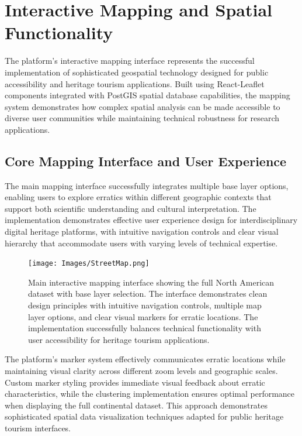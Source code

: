 \section{Interactive Mapping and Spatial Functionality}
\label{sec:interactive_mapping_results}

The platform's interactive mapping interface represents the successful implementation of sophisticated geospatial technology designed for public accessibility and heritage tourism applications. Built using React-Leaflet components integrated with PostGIS spatial database capabilities, the mapping system demonstrates how complex spatial analysis can be made accessible to diverse user communities while maintaining technical robustness for research applications.

\subsection{Core Mapping Interface and User Experience}
\label{subsec:core_mapping_interface}

The main mapping interface successfully integrates multiple base layer options, enabling users to explore erratics within different geographic contexts that support both scientific understanding and cultural interpretation. The implementation demonstrates effective user experience design for interdisciplinary digital heritage platforms, with intuitive navigation controls and clear visual hierarchy that accommodate users with varying levels of technical expertise.

\begin{figure}[htbp]
    \centering
    \texttt{[image: Images/StreetMap.png]}
    \caption{Main interactive mapping interface showing the full North American dataset with base layer selection. The interface demonstrates clean design principles with intuitive navigation controls, multiple map layer options, and clear visual markers for erratic locations. The implementation successfully balances technical functionality with user accessibility for heritage tourism applications.}
    \label{fig:main_map_interface}
\end{figure}

The platform's marker system effectively communicates erratic locations while maintaining visual clarity across different zoom levels and geographic scales. Custom marker styling provides immediate visual feedback about erratic characteristics, while the clustering implementation ensures optimal performance when displaying the full continental dataset. This approach demonstrates sophisticated spatial data visualization techniques adapted for public heritage tourism interfaces.

